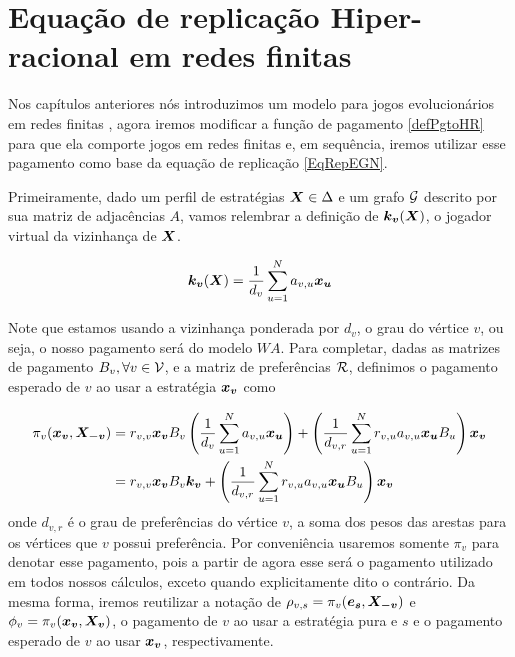 \chapter{Equação de replicação Hiper-racional em redes finitas}

Nos capítulos anteriores nós introduzimos um modelo para jogos evolucionários em redes finitas \cite{madeo2015}, agora iremos modificar a função de pagamento \eqref{defPgtoHR} para que ela comporte jogos em redes finitas e, em sequência, iremos utilizar esse pagamento como base da equação de replicação \eqref{EqRepEGN}.

Primeiramente, dado um perfil de estratégias $\boldsymbol{X}\in\Delta$ e um grafo $\mathcal{G}$ descrito por sua matriz de adjacências $A$, vamos relembrar a definição de $\boldsymbol{k_v}(\boldsymbol{X})$, o jogador virtual da vizinhança de $\boldsymbol{X}$.

\begin{equation}
    \boldsymbol{k_v}(\boldsymbol{X})=\frac{1}{d_v}\sum^N_{u=1} a_{v,u} \boldsymbol{x_u}
\end{equation}

Note que estamos usando a vizinhança ponderada por $d_v$, o grau do vértice $v$, ou seja, o nosso pagamento será do modelo $WA$. Para completar, dadas as matrizes de pagamento $B_v,\forall v\in\mathcal{V}$, e a matriz de preferências $\mathcal{R}$, definimos o pagamento esperado de $v$ ao usar a estratégia $\boldsymbol{x_v}$ como

\begin{equation}
\begin{split}
    \label{defPgtoEGNHR}
    \pi_v(\boldsymbol{x_v},\boldsymbol{X_{-v}}) &= r_{v,v}\boldsymbol{x_v} B_v \left(\frac{1}{d_v}\sum_{u=1}^N a_{v,u}\boldsymbol{x_u}\right)+ \left(\frac{1}{d_{v,r}}\sum_{u=1}^N r_{v,u} a_{v,u} \boldsymbol{x_u}B_u\right) \boldsymbol{x_v} \\
    &= r_{v,v}\boldsymbol{x_v} B_v \boldsymbol{k_v}+ \left(\frac{1}{d_{v,r}}\sum_{u=1}^N r_{v,u}a_{v,u}\boldsymbol{x_u}B_u\right) \boldsymbol{x_v}
\end{split}
\end{equation}
onde $d_{v,r}$ é o grau de preferências do vértice $v$, a soma dos pesos das arestas para os vértices que $v$ possui preferência. Por conveniência usaremos somente $\pi_v$ para denotar esse pagamento, pois a partir de agora esse será o pagamento utilizado em todos nossos cálculos, exceto quando explicitamente dito o contrário. Da mesma forma, iremos reutilizar a notação de $\rho_{v,s}=\pi_v(\boldsymbol{e_s},\boldsymbol{X_{-v}})$ e $\phi_v=\pi_v(\boldsymbol{x_v},\boldsymbol{X_v})$, o pagamento de $v$ ao usar a estratégia pura e $s$ e o pagamento esperado de $v$ ao usar $\boldsymbol{x_v}$, respectivamente.

